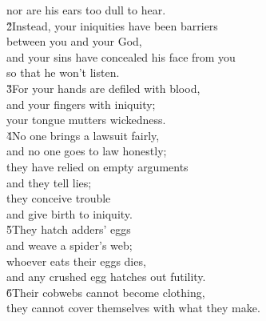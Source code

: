 \begin{poetry}
\poemll    nor are his ears too dull to hear. \\
\poeml \v{2}Instead, your iniquities have been barriers \\
\poemll    between you and your God, \\
\poeml and your sins have concealed his face from you \\
\poemll    so that he won't listen. \\
\poeml \v{3}For your hands are defiled with blood, \\
\poemll    and your fingers with iniquity; \\
\poemlll       your tongue mutters wickedness. \\
\poeml \v{4}No one brings a lawsuit fairly, \\
\poemll    and no one goes to law honestly; \\
\poeml they have relied on empty arguments \\
\poemll    and they tell lies; \\
\poeml they conceive trouble \\
\poemll    and give birth to iniquity. \\
\poeml \v{5}They hatch adders' eggs \\
\poemll    and weave a spider's web; \\
\poeml whoever eats their eggs dies, \\
\poemll    and any crushed egg hatches out futility. \\
\poeml \v{6}Their cobwebs cannot become clothing, \\
\poemll    they cannot cover themselves with what they make. \\

\end{poetry}
